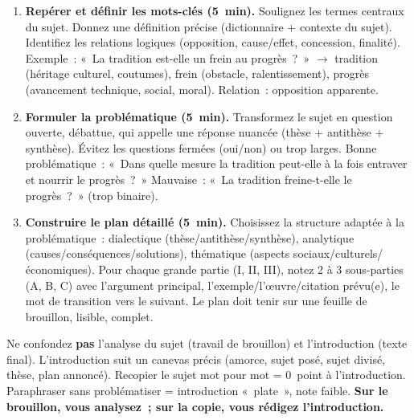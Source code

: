 \documentclass[11pt]{article}
\newcommand{\cle}[1]{{\popxbold\color{popdark}#1}}
\begin{document}
\begin{methode}
\begin{enumerate}
    \item \textbf{Repérer et définir les mots-clés (5~min).} Soulignez les termes centraux du sujet. Donnez une définition précise (dictionnaire + contexte du sujet). Identifiez les relations logiques (opposition, cause/effet, concession, finalité). Exemple~: «~La tradition est-elle un frein au progrès~?~» $\rightarrow$ \cle{tradition} (héritage culturel, coutumes), \cle{frein} (obstacle, ralentissement), \cle{progrès} (avancement technique, social, moral). Relation~: opposition apparente.
    \item \textbf{Formuler la problématique (5~min).} Transformez le sujet en question ouverte, débattue, qui appelle une réponse nuancée (thèse + antithèse + synthèse). Évitez les questions fermées (oui/non) ou trop larges. Bonne problématique~: «~Dans quelle mesure la tradition peut-elle à la fois entraver et nourrir le progrès~?~» Mauvaise~: «~La tradition freine-t-elle le progrès~?~» (trop binaire).
    \item \textbf{Construire le plan détaillé (5~min).} Choisissez la structure adaptée à la problématique~: dialectique (thèse/antithèse/synthèse), analytique (causes/conséquences/solutions), thématique (aspects sociaux/culturels/économiques). Pour chaque grande partie (I, II, III), notez 2 à 3 sous-parties (A, B, C) avec l'argument principal, l'exemple/l'œuvre/citation prévu(e), le mot de transition vers le suivant. Le plan doit tenir sur une feuille de brouillon, lisible, complet.
\end{enumerate}
\end{methode}

\begin{attention}
Ne confondez \textbf{pas} l'analyse du sujet (travail de brouillon) et l'introduction (texte final). L'introduction suit un canevas précis (amorce, sujet posé, sujet divisé, thèse, plan annoncé). Recopier le sujet mot pour mot = 0~point à l'introduction. Paraphraser sans problématiser = introduction «~plate~», note faible. \textbf{Sur le brouillon, vous analysez~; sur la copie, vous rédigez l'introduction.}
\end{attention}
\end{document}
